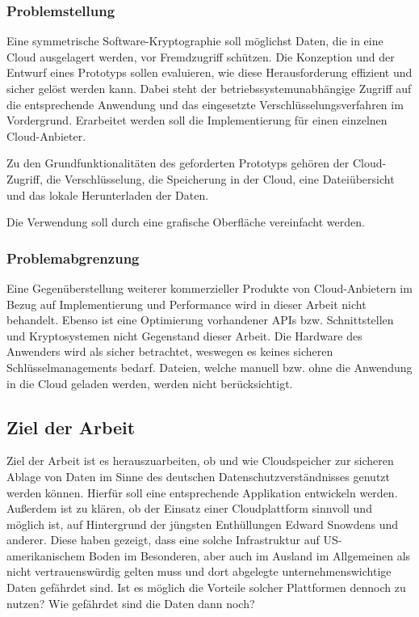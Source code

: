\documentclass[13pt,a4paper,bibliography=totocnumbered,listof=totocnumbered]{scrartcl}
\begin{document}
\subsubsection{Problemstellung}
Eine symmetrische Software-Kryptographie soll möglichst Daten, die in eine Cloud ausgelagert werden,  vor Fremdzugriff schützen. Die Konzeption und der Entwurf eines Prototyps sollen evaluieren, wie diese Herausforderung effizient und sicher gelöst werden kann. Dabei steht der betriebssystemunabhängige Zugriff auf die entsprechende Anwendung und das eingesetzte Verschlüsselungsverfahren im Vordergrund. Erarbeitet werden soll die Implementierung für einen einzelnen Cloud-Anbieter. 

Zu den Grundfunktionalitäten des geforderten Prototyps gehören der Cloud-Zugriff, die Verschlüsselung, die Speicherung in der Cloud, eine Dateiübersicht und das lokale Herunterladen der Daten.

Die Verwendung soll durch eine grafische Oberfläche vereinfacht werden.

\subsubsection{Problemabgrenzung}
Eine Gegenüberstellung weiterer kommerzieller Produkte von Cloud-Anbietern im Bezug auf Implementierung und Performance wird in dieser Arbeit nicht behandelt. Ebenso ist eine Optimierung vorhandener APIs bzw. Schnittstellen und Kryptosystemen nicht Gegenstand dieser Arbeit. Die Hardware des Anwenders wird als sicher betrachtet, weswegen es keines sicheren Schlüsselmanagements bedarf. Dateien, welche manuell bzw. ohne die Anwendung in die Cloud geladen werden, werden nicht berücksichtigt.

\subsection{Ziel der Arbeit}
Ziel der Arbeit ist es herauszuarbeiten, ob und wie Cloudspeicher zur sicheren Ablage von Daten im Sinne des deutschen Datenschutzverständnisses genutzt werden können. Hierfür soll eine entsprechende Applikation entwickeln werden. Außerdem ist zu klären, ob der Einsatz einer Cloudplattform sinnvoll und möglich ist, auf Hintergrund der jüngsten Enthüllungen Edward Snowdens und anderer. Diese haben gezeigt, dass eine solche Infrastruktur auf US-amerikanischem Boden im Besonderen, aber auch im Ausland im Allgemeinen als nicht vertrauenswürdig gelten muss und dort abgelegte unternehmenswichtige Daten gefährdet sind. Ist es möglich die Vorteile solcher Plattformen dennoch zu nutzen? Wie gefährdet sind die Daten dann noch?
\end{document}
